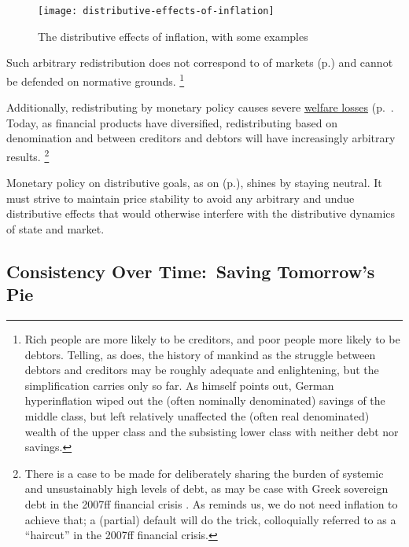 \begin{figure}[htbp]
	\centering
	\texttt{[image: distributive-effects-of-inflation]}
	\caption[Distributive Effects of Inflation]{The distributive effects of inflation, with some examples}
	\label{fig:distributive-effects-of-inflation}
\end{figure}

Such arbitrary redistribution does not correspond to  of markets  (p.\pageref{sec:inequality-dynamics}) and cannot be defended on normative grounds.
\footnote{
	Rich people are more likely to be creditors, and poor people more likely to be debtors.
	Telling, as \cite{Coggan2011} does, the history of mankind as the struggle between debtors and creditors \citep[paraphrasing][]{Marx-1867-aa} may be roughly adequate and enlightening, but the simplification carries only so far.
	As \cite[K6-24-04]{Coggan2011} himself points out, German hyperinflation wiped out the (often nominally denominated) savings of the middle class, but left relatively unaffected the (often real denominated) wealth of the upper class and the subsisting lower class with neither debt nor savings.
}

Additionally, redistributing by monetary policy causes severe \hyperref[sec:price-stability]{welfare losses} (p.~\pageref{sec:price-stability}.
Today, as financial products have diversified, redistributing based on denomination and between creditors and debtors will have increasingly arbitrary results.
\footnote{
	There is a case to be made for deliberately sharing the burden of systemic and unsustainably high levels of debt, as may be case with Greek sovereign debt in the 2007ff financial crisis \citep{Coggan2011}.
	As \citeauthor{Coggan2011} reminds us, we do not need inflation to achieve that;
	a (partial) default will do the trick, colloquially referred to as a ``haircut'' in the 2007ff financial crisis.
}

Monetary policy on distributive goals, as on  (p.\pageref{sec:production}), shines by staying neutral.
It must strive to maintain price stability to avoid any arbitrary and undue distributive effects that would otherwise interfere with the distributive dynamics of state and market.

\subsection[Consistency Over Time]{Consistency Over Time:~Saving Tomorrow's Pie}
	\label{sec:time}

